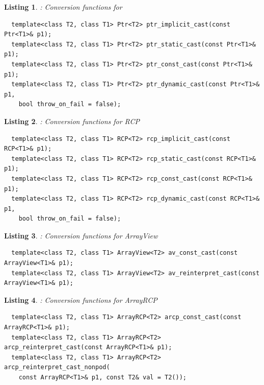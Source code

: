 \documentclass[pdf,ps2pdf,11pt]{SANDreport}
\newtheorem{listing}{Listing}
\begin{document}
{}\begin{listing}: Conversion functions for {}
\label{listing:Ptr-conversions}
{\small\begin{verbatim}
  template<class T2, class T1> Ptr<T2> ptr_implicit_cast(const Ptr<T1>& p1);
  template<class T2, class T1> Ptr<T2> ptr_static_cast(const Ptr<T1>& p1);
  template<class T2, class T1> Ptr<T2> ptr_const_cast(const Ptr<T1>& p1);
  template<class T2, class T1> Ptr<T2> ptr_dynamic_cast(const Ptr<T1>& p1,
    bool throw_on_fail = false);
\end{verbatim}}
\end{listing}


\begin{listing}: Conversion functions for RCP\\
\label{listing:RCP-conversions}
{\small\begin{verbatim}
  template<class T2, class T1> RCP<T2> rcp_implicit_cast(const RCP<T1>& p1);
  template<class T2, class T1> RCP<T2> rcp_static_cast(const RCP<T1>& p1);
  template<class T2, class T1> RCP<T2> rcp_const_cast(const RCP<T1>& p1);
  template<class T2, class T1> RCP<T2> rcp_dynamic_cast(const RCP<T1>& p1,
    bool throw_on_fail = false);
\end{verbatim}}
\end{listing}


\begin{listing}: Conversion functions for ArrayView\\
\label{listing:ArrayView-conversions}
{\small\begin{verbatim}
  template<class T2, class T1> ArrayView<T2> av_const_cast(const ArrayView<T1>& p1);
  template<class T2, class T1> ArrayView<T2> av_reinterpret_cast(const ArrayView<T1>& p1);
\end{verbatim}}
\end{listing}


\begin{listing}: Conversion functions for ArrayRCP\\
\label{listing:ArrayRCP-conversions}
{\small\begin{verbatim}
  template<class T2, class T1> ArrayRCP<T2> arcp_const_cast(const ArrayRCP<T1>& p1);
  template<class T2, class T1> ArrayRCP<T2> arcp_reinterpret_cast(const ArrayRCP<T1>& p1);
  template<class T2, class T1> ArrayRCP<T2> arcp_reinterpret_cast_nonpod(
    const ArrayRCP<T1>& p1, const T2& val = T2());
\end{verbatim}}
\end{listing}
\end{document}
